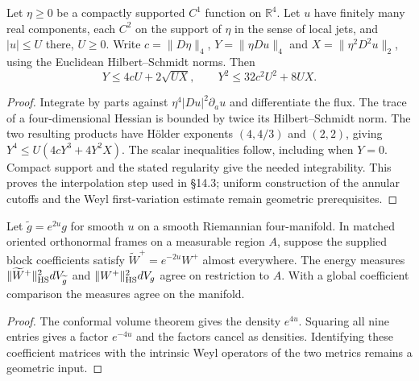 \begin{lemma}
\label{lem:buffered-euclidean-interpolation}
\leanok
Let $\eta\ge0$ be a compactly supported $C^1$ function on $\mathbb R^4$.
Let $u$ have finitely many real components, each $C^2$ on the support
of $\eta$ in the sense of local jets, and $|u|\le U$ there, $U\ge0$.
Write $c=\|D\eta\|_4$, $Y=\|\eta Du\|_4$ and
$X=\|\eta^2D^2u\|_2$, using the Euclidean Hilbert--Schmidt norms.
Then
\[
 Y\le4cU+2\sqrt{UX}, \qquad Y^2\le32c^2U^2+8UX .
\]
\end{lemma}
\begin{proof}
\leanok
Integrate by parts against $\eta^4|Du|^2\partial_a u$ and differentiate
the flux. The trace of a four-dimensional Hessian is bounded by twice
its Hilbert--Schmidt norm. The two resulting products have H\"older
exponents $(4,4/3)$ and $(2,2)$, giving
$Y^4\le U(4cY^3+4Y^2X)$. The scalar inequalities follow, including
when $Y=0$. Compact support and the stated regularity give the needed
integrability. This proves the interpolation step used in \S14.3;
uniform construction of the annular cutoffs and the Weyl
first-variation estimate remain geometric prerequisites.
\end{proof}

\begin{lemma}
\label{lem:conformal-framed-measure}
\leanok
Let $\widetilde g=e^{2u}g$ for smooth $u$ on a smooth Riemannian
four-manifold. In matched oriented orthonormal frames on a measurable
region $A$, suppose the supplied block coefficients satisfy
$\widetilde W^+=e^{-2u}W^+$ almost everywhere. The energy measures
$\|\widetilde W^+\|_{\rm HS}^2dV_{\widetilde g}$ and
$\|W^+\|_{\rm HS}^2dV_g$ agree on restriction to $A$. With a global
coefficient comparison the measures agree on the manifold.
\end{lemma}
\begin{proof}
\leanok
The conformal volume theorem gives the density $e^{4u}$.
Squaring all nine entries gives a factor $e^{-4u}$ and the factors
cancel as densities. Identifying these coefficient matrices with
the intrinsic Weyl operators of the two metrics remains a geometric input.
\end{proof}
